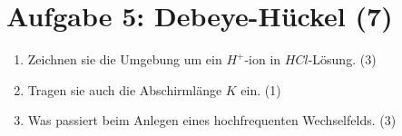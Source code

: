\section*{Aufgabe 5: Debeye-Hückel (7)}
\begin{enumerate}
\item Zeichnen sie die Umgebung um ein \(H^{+}\)-ion in \(HCl\)-Lösung. (3)

\item Tragen sie auch die Abschirmlänge \(K\) ein. (1)

\item Was passiert beim Anlegen eines hochfrequenten Wechselfelds. (3)
\end{enumerate}